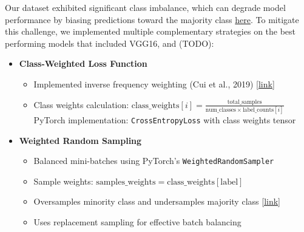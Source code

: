 \documentclass[a4paper,12pt]{article}
\begin{document}
Our dataset exhibited significant class imbalance, which can degrade model performance by biasing predictions toward the majority class \href{https://journalofbigdata.springeropen.com/articles/10.1186/s40537-019-0192-5}{here}. To mitigate this challenge, we implemented multiple complementary strategies on the best performing models that included VGG16, and (TODO):
\begin{itemize}
    \item \textbf{Class-Weighted Loss Function}
    \begin{itemize}
        \item Implemented inverse frequency weighting (Cui et al., 2019) \href{https://openaccess.thecvf.com/content_CVPR_2019/papers/Cui_Class-Balanced_Loss_Based_on_Effective_Number_of_Samples_CVPR_2019_paper.pdf}{[link]}
        \item Class weights calculation: \( \text{class\_weights}[i] = \frac{\text{total\_samples}}{\text{num\_classes} \times \text{label\_counts}[i]} \)
        \subitem PyTorch implementation: \texttt{CrossEntropyLoss} with class weights tensor
    \end{itemize}
    
    \item \textbf{Weighted Random Sampling}
    \begin{itemize}
        \item Balanced mini-batches using PyTorch's \texttt{WeightedRandomSampler}
        \item Sample weights: \( \text{samples\_weights} = \text{class\_weights}[\text{label}] \)
        \item Oversamples minority class and undersamples majority class \href{https://www.sciencedirect.com/science/article/pii/S0893608018302107}{[link]}
        \item Uses replacement sampling for effective batch balancing
    \end{itemize}
    

\end{itemize}
\end{document}
